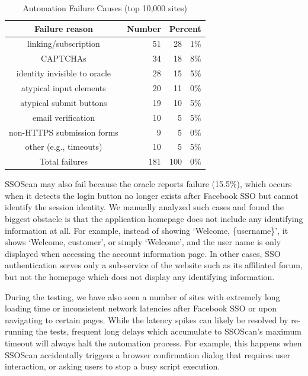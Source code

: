  \begin{table}[t]
 \begin{center}
 \begin{threeparttable}
 \begin{tabular}{|c|r|r@{.}l|}
 \hline
 \textbf{Failure reason} & \multicolumn{1}{|c|}{\textbf{Number}} & \multicolumn{2}{|c|}{\textbf{Percent}}\\
 \hline
 linking/subscription& 51 & 28 & 1\%\\
 \hline
 CAPTCHAs & 34 & 18 & 8\%\\
 \hline
 identity invisible to oracle & 28 & 15 & 5\%\\
 \hline
 atypical input elements & 20 & 11 & 0\%\\
 \hline
 atypical submit buttons & 19 & 10 & 5\%\\
 \hline
 email verification & 10 & 5 & 5\%\\
 \hline
 non-HTTPS submission forms & 9 & 5 & 0\%\\
 \hline
 other (e.g., timeouts) & 10 & 5 & 5\%\\
 \hline\hline
 Total failures & 181 & 100 &0\%\\
 \hline
 \end{tabular}
 \end{threeparttable}
 \end{center}
 \caption{Automation Failure Causes (top 10,000 sites)}
 \label{tab:ssoscan_study_failureReasons}
 \end{table}

 SSOScan may also fail because the oracle reports failure (15.5\%), which occurs when it detects the login button no longer exists after Facebook SSO but cannot identify the session identity.  We manually analyzed such cases and found the biggest obstacle is that the application homepage does not include any identifying information at all.  For example, instead of showing `Welcome, \{username\}', it shows `Welcome, customer', or simply `Welcome', and the user name is only displayed when accessing the account information page.  In other cases, SSO authentication serves only a sub-service of the website such as its affiliated forum, but not the homepage which does not display any identifying information.

 During the testing, we have also seen a number of sites with extremely long loading time or inconsistent network latencies after Facebook SSO or upon navigating to certain pages.  While the latency spikes can likely be resolved by re-running the tests, frequent long delays which accumulate to SSOScan's maximum timeout will always halt the automation process.  For example, this happens when SSOScan accidentally triggers a browser confirmation dialog that requires user interaction, or asking users to stop a busy script execution.


